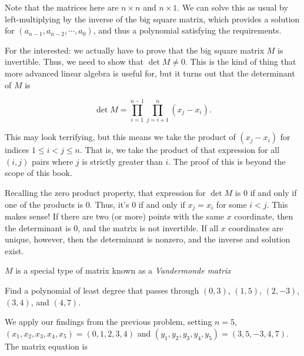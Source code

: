 \documentclass[../gatm_answers.tex]{subfiles}
\begin{document}
Note that the matrices here are $n\times n$ and $n\times 1$. We can solve this as usual by left-multiplying by the inverse of the big square matrix, which provides a solution for $(a_{n-1}, a_{n-2}, \cdots, a_0)$, and thus a polynomial satisfying the requirements.

For the interested: we actually have to prove that the big square matrix $M$ is invertible. Thus, we need to show that $\det M \neq 0$. This is the kind of thing that more advanced linear algebra is useful for, but it turns out that the determinant of $M$ is

$$\det M = \prod _ {i=1} ^ {n-1} \prod_{j=i+1} ^ {n} (x_j - x_i).$$

This may look terrifying, but this means we take the product of $(x_j - x_i)$ for indices $1\leq i < j\leq n$. That is, we take the product of that expression for all $(i,j)$ pairs where $j$ is strictly greater than $i$. The proof of this is beyond the scope of this book.

Recalling the zero product property, that expression for $\det M$ is $0$ if and only if one of the products is $0$. Thus, it's $0$ if and only if $x_j = x_i$ for some $i<j$. This makes sense! If there are two (or more) points with the same $x$ coordinate, then the determinant is $0$, and the matrix is not invertible. If all $x$ coordinates are unique, however, then the determinant is nonzero, and the inverse and solution exist.

$M$ is a special type of matrix known as a \textit{Vandermonde matrix}

\begin{outer_problem}
\item Find a polynomial of least degree that passes through $(0,3)$, $(1,5)$, $(2,-3)$, $(3,4)$, and $(4,7)$.
\end{outer_problem}

We apply our findings from the previous problem, setting $n=5$, $(x_1,x_2,x_3,x_4,x_5)=(0,1,2,3,4)$ and $(y_1,y_2,y_3,y_4,y_5)=(3,5,-3,4,7)$. The matrix equation is
\end{document}
